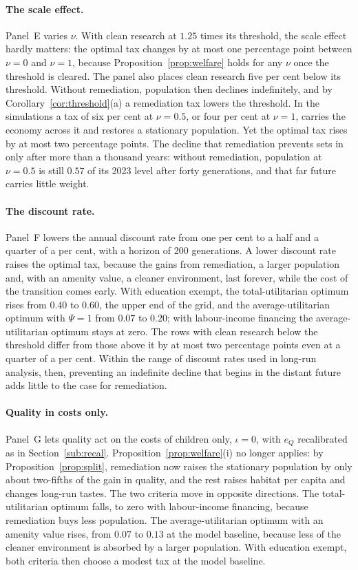 \documentclass[11pt]{article}
\begin{document}
\paragraph{The scale effect.}
Panel~E varies $\nu$. With clean research at $1.25$ times its threshold, the scale effect hardly matters:
the optimal tax changes by at most one percentage point between $\nu=0$ and $\nu=1$, because
Proposition~\ref{prop:welfare} holds for any $\nu$ once the threshold is cleared. The panel also places
clean research five per cent below its threshold. Without remediation, population then declines
indefinitely, and by Corollary~\ref{cor:threshold}(a) a remediation tax lowers the threshold. In the
simulations a tax of six per cent at $\nu=0.5$, or four per cent at $\nu=1$, carries the economy across it
and restores a stationary population. Yet the optimal tax rises by at most two percentage points. The
decline that remediation prevents sets in only after more than a thousand years: without remediation,
population at $\nu=0.5$ is still $0.57$ of its 2023 level after forty generations, and that far future
carries little weight.

\paragraph{The discount rate.}
Panel~F lowers the annual discount rate from one per cent to a half and a quarter of a per cent, with a
horizon of 200 generations. A lower discount rate raises the optimal tax, because the gains from
remediation, a larger population and, with an amenity value, a cleaner environment, last forever, while
the cost of the transition comes early. With education exempt, the total-utilitarian optimum rises from
$0.40$ to $0.60$, the upper end of the grid, and the average-utilitarian optimum with $\Psi=1$ from $0.07$ to $0.20$; with
labour-income financing the average-utilitarian optimum stays at zero. The rows with clean research below
the threshold differ from those above it by at most two percentage points even at a quarter of a per cent.
Within the range of discount rates used in long-run analysis, then, preventing an indefinite decline that
begins in the distant future adds little to the case for remediation.

\paragraph{Quality in costs only.}
Panel~G lets quality act on the costs of children only, $\iota=0$, with $e_Q$ recalibrated as in
Section~\ref{sub:recal}. Proposition~\ref{prop:welfare}(i) no longer applies: by
Proposition~\ref{prop:split}, remediation now raises the stationary population by only about two-fifths of
the gain in quality, and the rest raises habitat per capita and changes long-run tastes. The two criteria
move in opposite directions. The total-utilitarian optimum falls, to zero with labour-income financing,
because remediation buys less population. The average-utilitarian optimum with an amenity value rises,
from $0.07$ to $0.13$ at the model baseline, because less of the cleaner environment is absorbed by a
larger population. With education exempt, both criteria then choose a modest tax at the model baseline.
\end{document}
